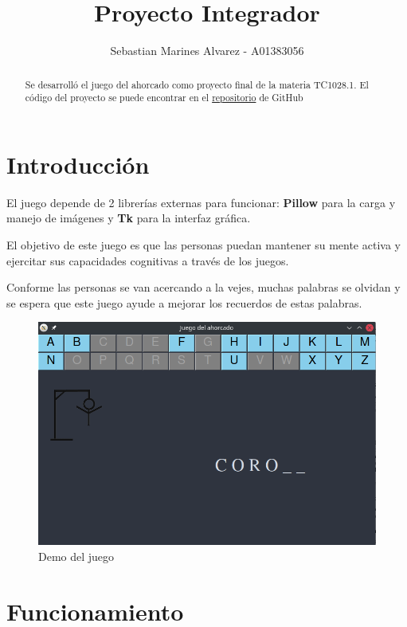 \documentclass{article}
\title{Proyecto Integrador}
\author{Sebastian Marines Alvarez - A01383056}
\begin{document}
\maketitle

\begin{abstract}
Se desarrolló el juego del ahorcado como proyecto final de la materia TC1028.1. El código del proyecto se puede encontrar en el \href{https://github.com/sebastianmarines/TC1028.1}{repositorio} de GitHub
\end{abstract}

\section{Introducción}
El juego depende de 2 librerías externas para funcionar: \textbf{Pillow} para la carga y manejo de imágenes y \textbf{Tk} para la interfaz gráfica.

El objetivo de este juego es que las personas puedan mantener su mente activa y ejercitar sus capacidades cognitivas a través de los juegos.

Conforme las personas se van acercando a la vejes, muchas palabras se olvidan y se espera que este juego ayude a mejorar los recuerdos de estas palabras.\\

\begin{figure}[h]
\includegraphics[width=\textwidth]{demo.png}
\caption{Demo del juego}
\label{fig:demo}
\end{figure}

\section{Funcionamiento}
\end{document}
